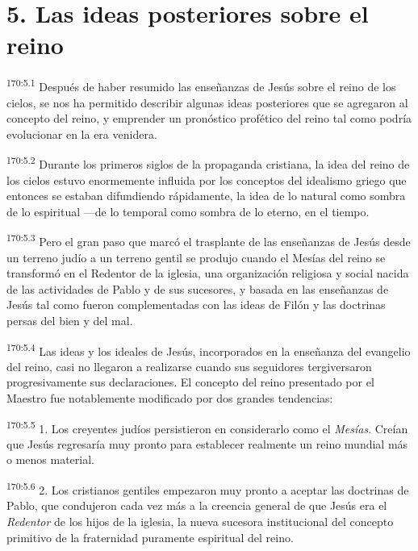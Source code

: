 \section*{5. Las ideas posteriores sobre el reino}
\par 
\textsuperscript{170:5.1} Después de haber resumido las enseñanzas de Jesús sobre el reino de los cielos, se nos ha permitido describir algunas ideas posteriores que se agregaron al concepto del reino, y emprender un pronóstico profético del reino tal como podría evolucionar en la era venidera.

\par 
\textsuperscript{170:5.2} Durante los primeros siglos de la propaganda cristiana, la idea del reino de los cielos estuvo enormemente influida por los conceptos del idealismo griego que entonces se estaban difundiendo rápidamente, la idea de lo natural como sombra de lo espiritual ---de lo temporal como sombra de lo eterno, en el tiempo.

\par 
\textsuperscript{170:5.3} Pero el gran paso que marcó el trasplante de las enseñanzas de Jesús desde un terreno judío a un terreno gentil se produjo cuando el Mesías del reino se transformó en el Redentor de la iglesia, una organización religiosa y social nacida de las actividades de Pablo y de sus sucesores, y basada en las enseñanzas de Jesús tal como fueron complementadas con las ideas de Filón y las doctrinas persas del bien y del mal.

\par 
\textsuperscript{170:5.4} Las ideas y los ideales de Jesús, incorporados en la enseñanza del evangelio del reino, casi no llegaron a realizarse cuando sus seguidores tergiversaron progresivamente sus declaraciones. El concepto del reino presentado por el Maestro fue notablemente modificado por dos grandes tendencias:

\par 
\textsuperscript{170:5.5} 1. Los creyentes judíos persistieron en considerarlo como el \textit{Mesías}. Creían que Jesús regresaría muy pronto para establecer realmente un reino mundial más o menos material.

\par 
\textsuperscript{170:5.6} 2. Los cristianos gentiles empezaron muy pronto a aceptar las doctrinas de Pablo, que condujeron cada vez más a la creencia general de que Jesús era el \textit{Redentor} de los hijos de la iglesia, la nueva sucesora institucional del concepto primitivo de la fraternidad puramente espiritual del reino.

